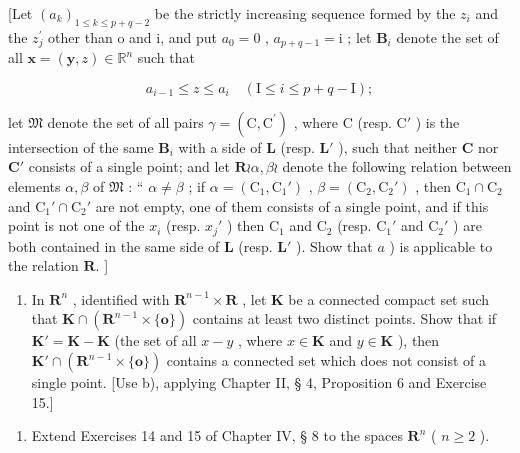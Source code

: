 {[}Let \((a_{k})_{1\leqslant k\leqslant p + q - 2}\) be the strictly increasing sequence formed by the \(z_{i}\) and the \(z_j^{\prime}\) other than o and i, and put \(a_0 = 0\) , \(a_{p + q - 1} = \mathrm{i}\) ; let \(\mathbf{B}_i\) denote the set of all \(\pmb {x} = (\pmb {y},z)\in \mathbb{R}^n\) such that

\[
a _ {i - 1} \leqslant z \leqslant a _ {i} \quad (\mathrm{I} \leqslant i \leqslant p + q - \mathrm{I});
\]

let \(\mathfrak{M}\) denote the set of all pairs \(\gamma = (\mathrm{C},\mathrm{C}^{\prime})\) , where \(\mathrm{C}\) (resp. \(\mathrm{C}'\) ) is the intersection of the same \(\mathbf{B}_i\) with a side of \(\mathbf{L}\) (resp. \(\mathbf{L}'\) ), such that neither \(\mathbf{C}\) nor \(\mathbf{C}'\) consists of a single point; and let \(\mathbf{R}\wr \alpha, \beta\wr\) denote the following relation between elements \(\alpha, \beta\) of \(\mathfrak{M}\) : `` \(\alpha \neq \beta\) ; if \(\alpha = (\mathrm{C}_1,\mathrm{C}_1')\) , \(\beta = (\mathrm{C}_2,\mathrm{C}_2')\) , then \(\mathrm{C}_1 \cap \mathrm{C}_2\) and \(\mathrm{C}_1' \cap \mathrm{C}_2'\) are not empty, one of them consists of a single point, and if this point is not one of the \(x_i\) (resp. \(x_j'\) ) then \(\mathrm{C}_1\) and \(\mathrm{C}_2\) (resp. \(\mathrm{C}_1'\) and \(\mathrm{C}_2'\) ) are both contained in the same side of \(\mathbf{L}\) (resp. \(\mathbf{L}'\) ). Show that \(a\) ) is applicable to the relation \(\mathbf{R}.\) {]}

\begin{enumerate}
\def\labelenumi{\alph{enumi})}
\setcounter{enumi}{2}
\tightlist
\item
  In \(\mathbf{R}^n\) , identified with \(\mathbf{R}^{n-1} \times \mathbf{R}\) , let \(\mathbf{K}\) be a connected compact set such that \(\mathbf{K} \cap (\mathbf{R}^{n-1} \times \{\mathbf{o}\})\) contains at least two distinct points. Show that if \(\mathbf{K}' = \mathbf{K} - \mathbf{K}\) (the set of all \(x - y\) , where \(x \in \mathbf{K}\) and \(y \in \mathbf{K}\) ), then \(\mathbf{K}' \cap (\mathbf{R}^{n-1} \times \{\mathbf{o}\})\) contains a connected set which does not consist of a single point. {[}Use b), applying Chapter II, § 4, Proposition 6 and Exercise 15.{]}
\end{enumerate}

\begin{enumerate}
\def\labelenumi{\arabic{enumi})}
\setcounter{enumi}{10}
\tightlist
\item
  Extend Exercises 14 and 15 of Chapter IV, § 8 to the spaces \(\mathbf{R}^n\) ( \(n \geqslant 2\) ).
\end{enumerate}

